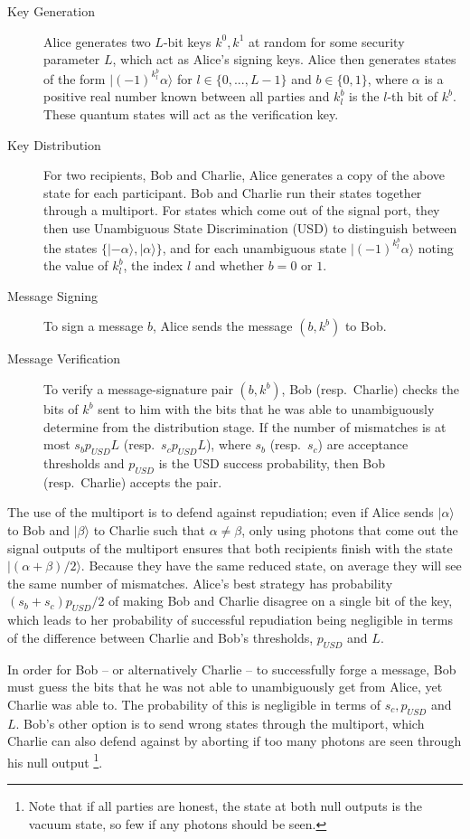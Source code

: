 \documentclass[%
 reprint,
 amsmath,amssymb,
 aps,
 pra,
]{revtex4-1}
\begin{document}
\begin{description}
\item[Key Generation]Alice generates two $L$-bit keys $k^0, k^1$ at random for some security parameter $L$, which act as Alice's signing keys. Alice then generates states of the form $|(-1)^{k^b_l}\alpha\rangle$ for $l \in \{0,...,L-1\}$ and $b \in \{0, 1\}$, where $\alpha$ is a positive real number known between all parties and $k^b_l$ is the $l$-th bit of $k^b$. These quantum states will act as the verification key.
\item[Key Distribution]For two recipients, Bob and Charlie, Alice generates a copy of the above state for each participant. Bob and Charlie run their states together through a multiport. For states which come out of the signal port, they then use Unambiguous State Discrimination (USD) \cite{Ivanovic1987257} to distinguish between the states $\{|-\alpha\rangle, |\alpha\rangle\}$, and for each unambiguous state $|(-1)^{k^b_l}\alpha\rangle$ noting the value of $k^b_l$, the index $l$ and whether $b = 0$ or $1$.
\item[Message Signing]To sign a message $b$, Alice sends the message $(b, k^b)$ to Bob.
\item[Message Verification]To verify a message-signature pair $(b, k^b)$, Bob (resp.\ Charlie) checks the bits of $k^b$ sent to him with the bits that he was able to unambiguously determine from the distribution stage. If the number of mismatches is at most $s_bp_{USD}L$ (resp.\ $s_cp_{USD}L$), where $s_b$ (resp.\ $s_c$) are acceptance thresholds and $p_{USD}$ is the USD success probability, then Bob (resp.\ Charlie) accepts the pair.
\end{description}

The use of the multiport is to defend against repudiation; even if Alice sends $|\alpha\rangle$ to Bob and $|\beta\rangle$ to Charlie such that $\alpha \neq \beta$, only using photons that come out the signal outputs of the multiport ensures that both recipients finish with the state $|(\alpha + \beta)/2\rangle$. Because they have the same reduced state, on average they will see the same number of mismatches. Alice's best strategy has probability $(s_b + s_c)p_{USD}/2$ of making Bob and Charlie disagree on a single bit of the key, which leads to her probability of successful repudiation being negligible in terms of the difference between Charlie and Bob's thresholds, $p_{USD}$ and $L$.

In order for Bob -- or alternatively Charlie -- to successfully forge a message, Bob must guess the bits that he was not able to unambiguously get from Alice, yet Charlie was able to. The probability of this is negligible in terms of $s_c, p_{USD}$ and $L$. Bob's other option is to send wrong states through the multiport, which Charlie can also defend against by aborting if too many photons are seen through his null output \footnote{Note that if all parties are honest, the state at both null outputs is the vacuum state, so few if any photons should be seen.}.
\end{document}
